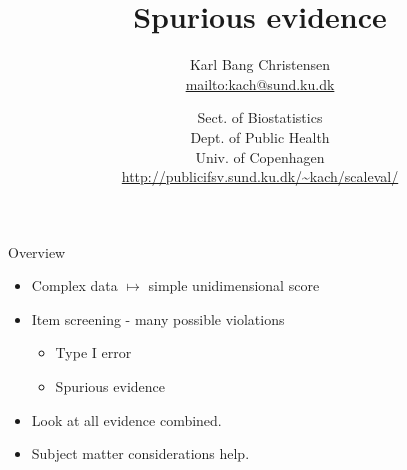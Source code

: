 \documentclass{beamer}
\title{Spurious evidence}
\author{Karl Bang Christensen \\ \href{mailto:kach@sund.ku.dk}{mailto:kach@sund.ku.dk}}
\date{Sect. of Biostatistics\\Dept. of Public Health\\Univ. of Copenhagen\\ \url{http://publicifsv.sund.ku.dk/~kach/scaleval/}}
\begin{document}
\maketitle




\begin{frame}{Overview}
\begin{itemize}
\item Complex data $\mapsto$ simple unidimensional score
\item Item screening - many possible violations
\begin{itemize}
\item Type I error
\item Spurious evidence
\end{itemize}
\item Look at all evidence combined.
\item Subject matter considerations help.
\end{itemize}
\end{frame}
\end{document}
